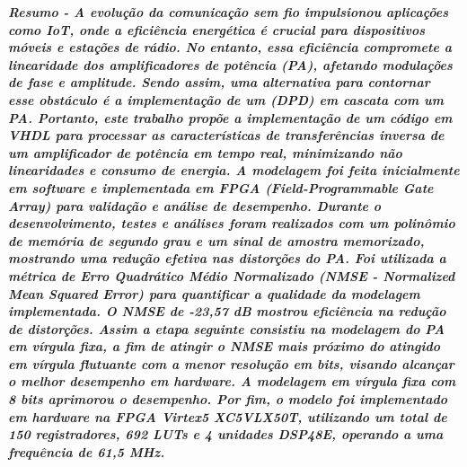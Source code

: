 \documentclass[twocolumn, a4paper]{article}
\begin{document}
\begin{strip}
	\vspace*{\dimexpr-\baselineskip-\stripsep\relax}
	\maketitle
	\vskip\baselineskip
	\noindent %
	\vskip\baselineskip
\end{strip}
\thispagestyle{specialfooter}
\vspace{3pt}\textbf{\textit{Resumo - A evolução da comunicação sem fio impulsionou aplicações como IoT, onde a eficiência energética é crucial para dispositivos móveis e estações de rádio. No entanto, essa eficiência compromete a linearidade dos amplificadores de potência (PA), afetando modulações de fase e amplitude. Sendo assim, uma alternativa para contornar esse obstáculo é a implementação de um (DPD) em cascata com um PA. Portanto, este trabalho propõe a implementação de um código em VHDL para processar as características de transferências inversa de um amplificador de potência em tempo real, minimizando não linearidades e consumo de energia. A modelagem foi feita inicialmente em software e implementada em FPGA (Field-Programmable Gate Array) para validação e análise de desempenho. Durante o desenvolvimento, testes e análises foram realizados com um polinômio de memória de segundo grau e um sinal de amostra memorizado, mostrando uma redução efetiva nas distorções do PA. Foi utilizada a métrica de Erro Quadrático Médio Normalizado (NMSE - Normalized Mean Squared Error) para quantificar a qualidade da modelagem implementada. O NMSE de -23,57 dB mostrou eficiência na redução de distorções. Assim a etapa seguinte consistiu na modelagem do PA em vírgula fixa, a fim de atingir o NMSE mais próximo do atingido em vírgula flutuante com a menor resolução em bits, visando alcançar o melhor desempenho em hardware. A modelagem em vírgula fixa com 8 bits aprimorou o desempenho. Por fim, o modelo foi implementado em hardware na FPGA Virtex5 XC5VLX50T, utilizando um total de 150 registradores, 692 LUTs e 4 unidades DSP48E, operando a uma frequência de 61,5 MHz.}}
\end{document}
